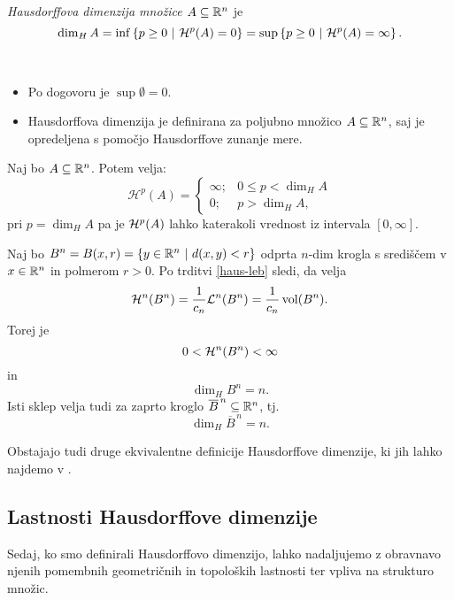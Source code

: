 \begin{definicija}
    \emph{Hausdorffova dimenzija množice \(A \subseteq \mathbb{R}^n\)} je 
    \[\dim_H A = \inf \left\{p \geq 0 \ | \ \mathcal{H}^{p}(A) = 0\right\} = \sup \left\{p \geq 0 \ | \ \mathcal{H}^{p}(A) = \infty\right\}.\]
\end{definicija}

\begin{opomba} \ 
    \begin{itemize}
        \item Po dogovoru je \(\sup \emptyset = 0\).
        \item Hausdorffova dimenzija je definirana za poljubno množico \(A \subseteq \mathbb{R}^n\), saj je opredeljena s pomočjo Hausdorffove zunanje mere.
    \end{itemize}    
\end{opomba}

\begin{opomba}
    Naj bo \(A \subseteq \mathbb{R}^n\). Potem velja:
        \[
            \mathcal{H}^{p}(A) = \begin{cases}
                \infty; &0 \leq p < \dim_H A \\ 
                0; &p > \dim_H A,
            \end{cases}
        \]        
        pri \(p = \dim_H A\) pa je \(\mathcal{H}^p(A)\) lahko katerakoli vrednost iz intervala \([0, \infty]\).
\end{opomba}

\begin{zgled}
    \label{dim-ball}
    Naj bo \(B^n = B(x, r) = \left\{y \in \mathbb{R}^n \ | \ d(x, y) < r\right\}\) odprta \(n\)-dim krogla s središčem v \(x \in \mathbb{R}^n\) in polmerom \(r > 0\). Po trditvi \ref{haus-leb} sledi, da velja
    \[\mathcal{H}^n(B^n) = \frac{1}{c_n} \mathcal{L}^n(B^n) = \frac{1}{c_n} \operatorname{vol}(B^n).\]
    Torej je 
    \[0 < \mathcal{H}^n(B^n) < \infty\]
    in 
    \[\dim_H B^n = n.\]
    Isti sklep velja tudi za zaprto kroglo \(\overline{B}^{\, n} \subseteq \mathbb{R}^n\), tj.
    \[\dim_H \overline{B}^{\, n} = n.\]
\end{zgled}

\begin{opomba}
    Obstajajo tudi druge ekvivalentne definicije Hausdorffove dimenzije, ki jih lahko najdemo v \cite{fk-fg}.
\end{opomba}

\subsection{Lastnosti Hausdorffove dimenzije}
Sedaj, ko smo definirali Hausdorffovo dimenzijo, lahko nadaljujemo z obravnavo njenih pomembnih geometričnih in topoloških lastnosti ter vpliva na strukturo množic.


